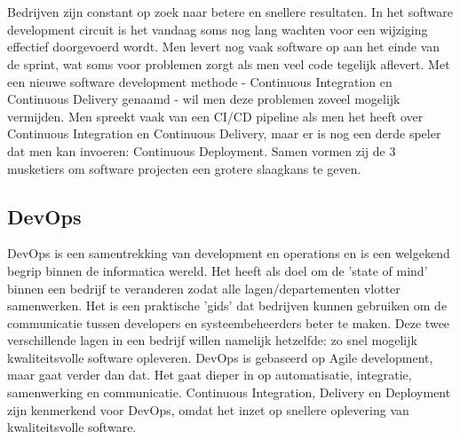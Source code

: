 \chapter{}
\label{ch:stand-van-zaken}

Bedrijven zijn constant op zoek naar betere en snellere resultaten. In het software development circuit is het vandaag soms nog lang wachten voor een wijziging effectief doorgevoerd wordt. Men levert nog vaak software op aan het einde van de sprint, wat soms voor problemen zorgt als men veel code tegelijk aflevert. Met een nieuwe software development methode - Continuous Integration en Continuous Delivery genaamd - wil men deze problemen zoveel mogelijk vermijden. Men spreekt vaak van een CI/CD pipeline als men het heeft over Continuous Integration en Continuous Delivery, maar er is nog een derde speler dat men kan invoeren: Continuous Deployment. Samen vormen zij de 3 musketiers om software projecten een grotere slaagkans te geven.

\section{DevOps}
\label{sec:devops}
    DevOps is een samentrekking van development en operations en is een welgekend begrip binnen de informatica wereld. Het heeft als doel om de 'state of mind' binnen een bedrijf te veranderen zodat alle lagen/departementen vlotter samenwerken. Het is een praktische 'gids' dat bedrijven kunnen gebruiken om de communicatie tussen developers en systeembeheerders beter te maken. Deze twee verschillende lagen in een bedrijf willen namelijk hetzelfde: zo snel mogelijk kwaliteitsvolle software opleveren. DevOps is gebaseerd op Agile development, maar gaat verder dan dat. Het gaat dieper in op automatisatie, integratie, samenwerking en communicatie. 
    Continuous Integration, Delivery en Deployment zijn kenmerkend voor DevOps, omdat het inzet op snellere oplevering van kwaliteitsvolle software. ~\autocite{Riti2018}
    

